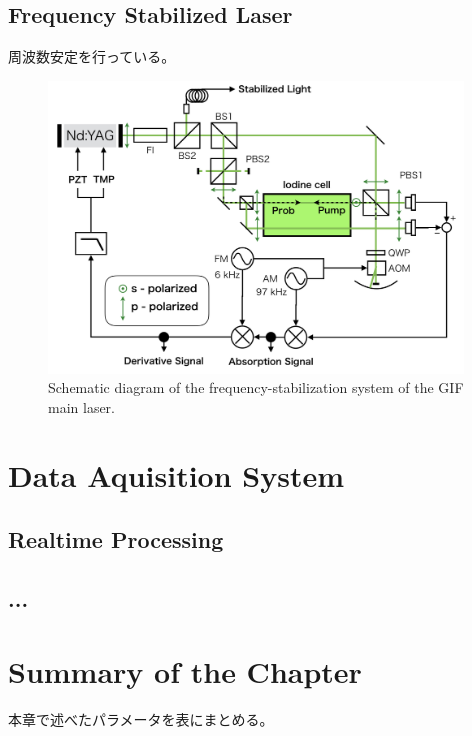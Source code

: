 \subsection{Frequency Stabilized Laser}

周波数安定を行っている。

\begin{figure}[h]
  \begin{center}   
    \includegraphics[width=11cm]{./img_chap4/img417.png}
    \caption{Schematic diagram of the frequency-stabilization system of the GIF main laser.}\label{img:img417}
  \end{center}
\end{figure}

\section{Data Aquisition System}
\subsection{Realtime Processing}


\subsection{...}



\section{Summary of the Chapter} %
本章で述べたパラメータを表にまとめる。
